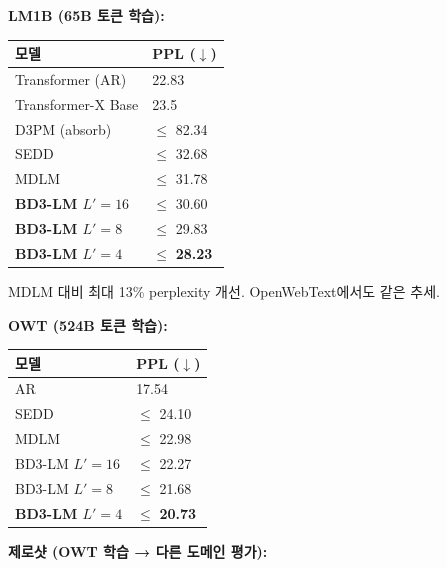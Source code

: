 \documentclass[
]{article}
\begin{document}
\textbf{LM1B (65B 토큰 학습):}

\begin{longtable}[]{@{}ll@{}}
\toprule()
모델 & PPL (\(\downarrow\)) \\
\midrule()
\endhead
Transformer (AR) & 22.83 \\
Transformer-X Base & 23.5 \\
D3PM (absorb) & \(\le\) 82.34 \\
SEDD & \(\le\) 32.68 \\
MDLM & \(\le\) 31.78 \\
\textbf{BD3-LM \(L'=16\)} & \(\le\) 30.60 \\
\textbf{BD3-LM \(L'=8\)} & \(\le\) 29.83 \\
\textbf{BD3-LM \(L'=4\)} & \(\le\) \textbf{28.23} \\
\bottomrule()
\end{longtable}

MDLM 대비 최대 13\% perplexity 개선. OpenWebText에서도 같은 추세.

\textbf{OWT (524B 토큰 학습):}

\begin{longtable}[]{@{}ll@{}}
\toprule()
모델 & PPL (\(\downarrow\)) \\
\midrule()
\endhead
AR & 17.54 \\
SEDD & \(\le\) 24.10 \\
MDLM & \(\le\) 22.98 \\
BD3-LM \(L'=16\) & \(\le\) 22.27 \\
BD3-LM \(L'=8\) & \(\le\) 21.68 \\
\textbf{BD3-LM \(L'=4\)} & \(\le\) \textbf{20.73} \\
\bottomrule()
\end{longtable}

\textbf{제로샷 (OWT 학습 → 다른 도메인 평가):}
\end{document}

